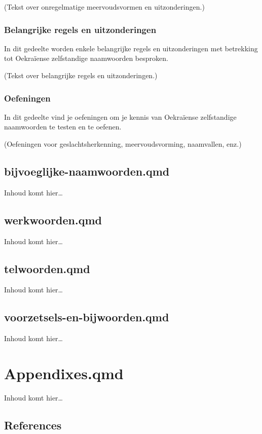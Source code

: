 \documentclass[
  letterpaper,
  DIV=11,
  numbers=noendperiod]{scrreprt}
\newlength{\cslhangindent}
\newlength{\cslentryspacingunit} %
\newenvironment{CSLReferences}[2] %
 {%
  \setlength{\parindent}{0pt}
  \ifodd #1
  \let\oldpar\par
  \def\par{\hangindent=\cslhangindent\oldpar}
  \fi
  \setlength{\parskip}{#2\cslentryspacingunit}
 }%
 {}
\begin{document}
(Tekst over onregelmatige meervoudsvormen en uitzonderingen.)

\hypertarget{belangrijke-regels-en-uitzonderingen}{%
\section{Belangrijke regels en
uitzonderingen}\label{belangrijke-regels-en-uitzonderingen}}

In dit gedeelte worden enkele belangrijke regels en uitzonderingen met
betrekking tot Oekraïense zelfstandige naamwoorden besproken.

(Tekst over belangrijke regels en uitzonderingen.)

\hypertarget{oefeningen}{%
\section{Oefeningen}\label{oefeningen}}

In dit gedeelte vind je oefeningen om je kennis van Oekraïense
zelfstandige naamwoorden te testen en te oefenen.

(Oefeningen voor geslachtsherkenning, meervoudsvorming, naamvallen,
enz.)

\hypertarget{bijvoeglijke-naamwoorden.qmd}{%
\chapter{bijvoeglijke-naamwoorden.qmd}\label{bijvoeglijke-naamwoorden.qmd}}

Inhoud komt hier\ldots{}

\hypertarget{werkwoorden.qmd}{%
\chapter{werkwoorden.qmd}\label{werkwoorden.qmd}}

Inhoud komt hier\ldots{}

\hypertarget{telwoorden.qmd}{%
\chapter{telwoorden.qmd}\label{telwoorden.qmd}}

Inhoud komt hier\ldots{}

\hypertarget{voorzetsels-en-bijwoorden.qmd}{%
\chapter{voorzetsels-en-bijwoorden.qmd}\label{voorzetsels-en-bijwoorden.qmd}}

Inhoud komt hier\ldots{}

\part{Appendixes.qmd}

Inhoud komt hier\ldots{}

\hypertarget{references}{%
\chapter*{References}\label{references}}


\hypertarget{refs}{}
\begin{CSLReferences}{0}{0}
\end{CSLReferences}
\end{document}
